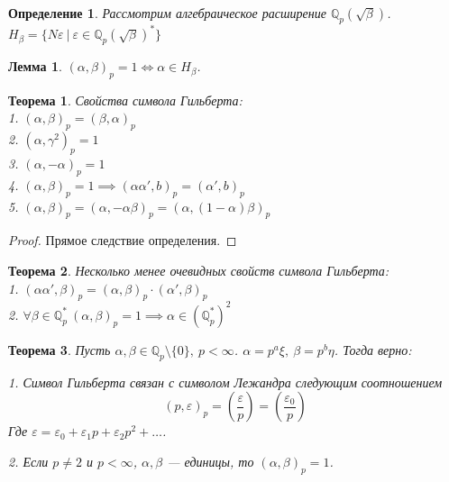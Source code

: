 \documentclass[11pt]{article}
\newtheorem{theorem}{Теорема}
\newtheorem{lemma}{Лемма}
\newtheorem{definition}{Определение}
\newcommand{\Q}{\mathbb{Q}}
\begin{document}
\begin{definition}
    Рассмотрим алгебраическое расширение $\Q_p(\sqrt{\beta})$.
    $H_{\beta} = \{N\varepsilon\ |\ \varepsilon \in \Q_p(\sqrt{\beta})^*  \}$
\end{definition}

\begin{lemma}
    $(\alpha, \beta)_p = 1 \iff \alpha \in H_{\beta}$.
\end{lemma}

\begin{theorem}
    Свойства символа Гильберта: \\
    1. $(\alpha, \beta)_p = (\beta, \alpha)_p$ \\
    2. $(\alpha, \gamma^2)_p = 1$ \\
    3. $(\alpha, -\alpha)_p = 1$ \\
    4. $(\alpha, \beta)_p = 1 \implies (\alpha \alpha', b)_p = (\alpha', b)_p$ \\
    5. $(\alpha, \beta)_p = (\alpha, -\alpha \beta)_p = (\alpha, (1-\alpha)\beta)_p$
\end{theorem}
\begin{proof}
    Прямое следствие определения.
\end{proof}

\begin{theorem}
    Несколько менее очевидных свойств символа Гильберта: \\
    1. $(\alpha \alpha', \beta)_p = (\alpha, \beta)_p \cdot (\alpha', \beta)_p$ \\
    2. $\forall \beta \in \Q_p^* \ (\alpha, \beta)_p = 1 \implies \alpha \in (\Q_p^*)^2$
\end{theorem}

\begin{theorem}
    Пусть $\alpha, \beta \in \Q_p \setminus \{0\},\ p < \infty$.
    $\alpha = p^a \xi,\ \beta = p^b \eta$.
    Тогда верно:
    
    1. Символ Гильберта связан с символом Лежандра следующим соотношением
    \begin{equation*}
        (p, \varepsilon)_p = \left (\frac{\varepsilon}{p}\right) = \left (\frac{\varepsilon_0}{p}\right)
    \end{equation*}
    Где $\varepsilon = \varepsilon_0 + \varepsilon_1 p + \varepsilon_2 p^2 + \dots$.
    
    2. Если $p \neq 2$ и $p < \infty$, $\alpha, \beta$ --- единицы, то $(\alpha, \beta)_p = 1$.
\end{theorem}
\end{document}

